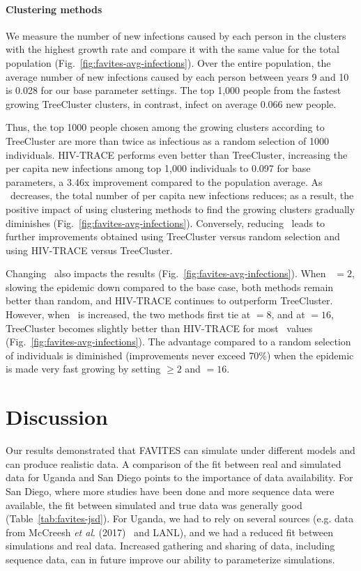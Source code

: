 \paragraph{Clustering methods} We measure the number of new infections caused by each person in the clusters with the highest growth rate and compare it with the same value for the total population (Fig.~\ref{fig:favites-avg-infections}). Over the entire population, the average number of new infections caused by each person between years 9 and 10 is 0.028 for our base parameter settings. The top 1,000 people from the fastest growing TreeCluster clusters, in contrast, infect on average 0.066 new people.

Thus, the top 1000 people chosen among the growing clusters according to TreeCluster are more than twice as infectious as a random selection of 1000 individuals. HIV-TRACE performs even better than TreeCluster, increasing the per capita new infections among top 1,000 individuals to 0.097 for base parameters, a 3.46x improvement compared to the population average. As \EART\ decreases, the total number of per capita new infections reduces; as a result, the positive impact of using clustering methods to find the growing clusters gradually diminishes (Fig.~\ref{fig:favites-avg-infections}). Conversely, reducing \EART\ leads to further improvements obtained using TreeCluster versus random selection and using HIV-TRACE versus TreeCluster.

Changing \ED\ also impacts the results (Fig.~\ref{fig:favites-avg-infections}). When \ED\ $=2$, slowing the epidemic down compared to the base case, both methods remain better than random, and HIV-TRACE continues to outperform TreeCluster. However, when \ED\ is increased, the two methods first tie at \ED$=8$, and at \ED$=16$, TreeCluster becomes slightly better than HIV-TRACE for most \EART\ values (Fig.~\ref{fig:favites-avg-infections}). The advantage compared to a random selection of individuals is diminished (improvements never exceed 70\%) when the epidemic is made very fast growing by setting \EART$\geq 2$ and \ED$=16$.

\section{Discussion}
Our results demonstrated that FAVITES can simulate under different models and can produce realistic data. A comparison of the fit between real and simulated data for Uganda and San Diego points to the importance of data availability. For San Diego, where more studies have been done and more sequence data were available, the fit between simulated and true data was generally good (Table~\ref{tab:favites-jsd}). For Uganda, we had to rely on several sources (e.g. data from McCreesh \textit{et al}. (2017)~\cite{McCreesh2017} and \gls{LANL}), and we had a reduced fit between simulations and real data. Increased gathering and sharing of data, including sequence data, can in future improve our ability to parameterize simulations.

